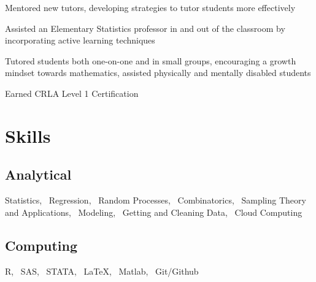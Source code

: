 \documentclass[]{deedy-resume-openfont}
\begin{document}
\begin{tightemize}
\item Mentored new tutors, developing strategies to tutor students more effectively
\item Assisted an Elementary Statistics professor in and out of the classroom by incorporating active learning techniques
\item Tutored students both one-on-one and in small groups, encouraging a growth mindset towards mathematics, assisted physically and mentally disabled students
\item Earned CRLA Level 1 Certification
\end{tightemize}
\sectionsep


\section{Skills}
\begin{minipage}[t]{.6\textwidth}
\subsection{Analytical}
Statistics, \, Regression, \, Random Processes, \, Combinatorics, \, Sampling Theory and Applications, \, Modeling, \, Getting and Cleaning Data, \, Cloud Computing
\sectionsep
\end{minipage}
\hfill
\begin{minipage}[t]{.35\textwidth}
\subsection{Computing}
R, \, SAS, \, STATA, \, \LaTeX, \, Matlab, \,  Git/Github
\end{minipage}
\end{document}
